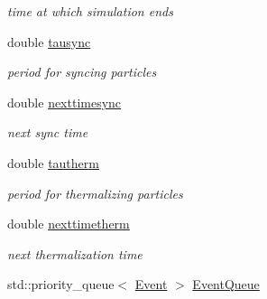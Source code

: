\begin{CompactItemize}
\begin{CompactList}\small\item\em time at which simulation ends \item\end{CompactList}\item 
\hypertarget{classEDsimul_ea42c7e9c85334b7a0790d17fac4ec39}{
double \hyperlink{classEDsimul_ea42c7e9c85334b7a0790d17fac4ec39}{tausync}}
\label{classEDsimul_ea42c7e9c85334b7a0790d17fac4ec39}

\begin{CompactList}\small\item\em period for syncing particles \item\end{CompactList}\item 
\hypertarget{classEDsimul_69a5e6d44e7537186c29a4a65c9cc79b}{
double \hyperlink{classEDsimul_69a5e6d44e7537186c29a4a65c9cc79b}{nexttimesync}}
\label{classEDsimul_69a5e6d44e7537186c29a4a65c9cc79b}

\begin{CompactList}\small\item\em next sync time \item\end{CompactList}\item 
\hypertarget{classEDsimul_87340d314c63552b02a15ac8a51eb967}{
double \hyperlink{classEDsimul_87340d314c63552b02a15ac8a51eb967}{tautherm}}
\label{classEDsimul_87340d314c63552b02a15ac8a51eb967}

\begin{CompactList}\small\item\em period for thermalizing particles \item\end{CompactList}\item 
\hypertarget{classEDsimul_769eba723695dc0336aa43fa14c2ac84}{
double \hyperlink{classEDsimul_769eba723695dc0336aa43fa14c2ac84}{nexttimetherm}}
\label{classEDsimul_769eba723695dc0336aa43fa14c2ac84}

\begin{CompactList}\small\item\em next thermalization time \item\end{CompactList}\item 
\hypertarget{classEDsimul_3f59a922bf59e9fcd34880d49afa0512}{
std::priority\_\-queue$<$ \hyperlink{classEvent}{Event} $>$ \hyperlink{classEDsimul_3f59a922bf59e9fcd34880d49afa0512}{EventQueue}}
\label{classEDsimul_3f59a922bf59e9fcd34880d49afa0512}


\end{CompactItemize}
